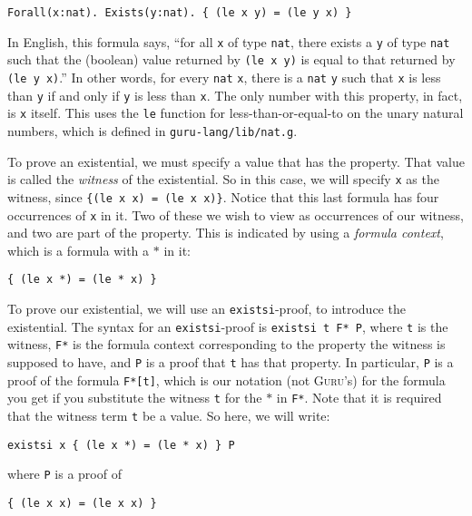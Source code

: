 \documentclass{book}[12pt]
\newcommand{\guru}[0]{\textsc{Guru}\xspace}
\begin{document}
\begin{verbatim}
Forall(x:nat). Exists(y:nat). { (le x y) = (le y x) }
\end{verbatim}

\noindent In English, this formula says, ``for all \texttt{x} of type
\texttt{nat}, there exists a \texttt{y} of type \texttt{nat} such that
the (boolean) value returned by \texttt{(le x y)} is equal to that
returned by \texttt{(le y x)}.''  In other words, for every
\texttt{nat} \texttt{x}, there is a \texttt{nat} \texttt{y} such that
\texttt{x} is less than \texttt{y} if and only if \texttt{y} is less
than \texttt{x}.  The only number with this property, in fact, is
\texttt{x} itself.  This uses the \texttt{le} function for
less-than-or-equal-to on the unary natural numbers, which is defined
in \texttt{guru-lang/lib/nat.g}.

To prove an existential, we must specify a value that has the
property.  That value is called the \emph{witness} of the existential.
So in this case, we will specify \texttt{x} as the witness, since
\texttt{\{(le x x) = (le x x)\}}.  Notice that this last formula
has four occurrences of \texttt{x} in it.  Two of these we wish
to view as occurrences of our witness, and two are part of the
property.  This is indicated by using a \emph{formula context},
which is a formula with a $*$ in it: 

\begin{verbatim}
{ (le x *) = (le * x) }
\end{verbatim}

\noindent To prove our existential, we will use an
\texttt{existsi}-proof, to introduce the existential.  The syntax for
an \texttt{existsi}-proof is \texttt{existsi t F* P}, where \texttt{t}
is the witness, \texttt{F*} is the formula context corresponding to
the property the witness is supposed to have, and \texttt{P} is a
proof that \texttt{t} has that property.  In particular, \texttt{P} is
a proof of the formula \texttt{F*[t]}, which is our notation (not
\guru's) for the formula you get if you substitute the witness
\texttt{t} for the $*$ in \texttt{F*}.  Note that it is required that
the witness term \texttt{t} be a value.  So here, we will write:

\begin{verbatim}
existsi x { (le x *) = (le * x) } P
\end{verbatim}

\noindent where \texttt{P} is a proof of

\begin{verbatim}
{ (le x x) = (le x x) }
\end{verbatim}
\end{document}
